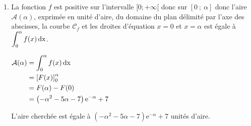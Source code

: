 \documentclass[10pt]{article}
\providecommand{\e}{{\mathrm{e}}}
\begin{document}
\begin{enumerate}
Pour tout réel $x$ : $x^2+3x+2 =(x+2)(x+1)$ 

Les racines sont donc $-2$ et $-1$.

De plus le coefficient dominant est positif donc $x^2+3x+2$ est positif, entre autre, sur l'intervalle $]-1~;~ +\infty[$ et donc sur l'intervalle $[0~;~+\infty[$.

La fonction $f$ est donc positive sur l'intervalle $[0~;~+\infty[$.

\item La fonction $f$ est positive sur l'intervalle $[0;+\infty[$ donc sur $[0~;~\alpha]$ donc l'aire $\mathcal{A}(\alpha)$, exprimée en unité d'aire, du domaine du plan délimité par l'axe des abscisses, la courbe $\mathcal{C}_{f}$ et les droites d'équation $x=0$ et $x=\alpha$ est égale à $\displaystyle  \int_0^{\alpha}f(x) \,\rm{d} x$.

$\begin{aligned} \mathcal{A}(\alpha) & = \displaystyle  \int_0^{\alpha}f(x) \,\rm{d} x\\
	& = {\left[ F(x) \right]}_0^{\alpha}\\
	& = F(\alpha)-F(0)\\
	&= \left( -\alpha^2-5\alpha-7\right)\e^{-\alpha}+ 7
\end{aligned}$

L'aire cherchée est égale à $ \left( -\alpha^2-5\alpha-7\right)\e^{-\alpha}+7$ unités d'aire.

\end{enumerate}
\end{document}
